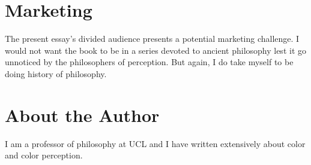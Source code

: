 \documentclass[12pt]{article}
\begin{document}

\section{Marketing} %
\label{sec:marketing}

The present essay's divided audience presents a potential marketing challenge. I would not want the book to be in a series devoted to ancient philosophy lest it go unnoticed by the philosophers of perception. But again, I do take myself to be doing history of philosophy.


\section{About the Author} %
\label{sec:about_the_author}

I am a professor of philosophy at UCL and I have written extensively about color and color perception.

\end{document}
